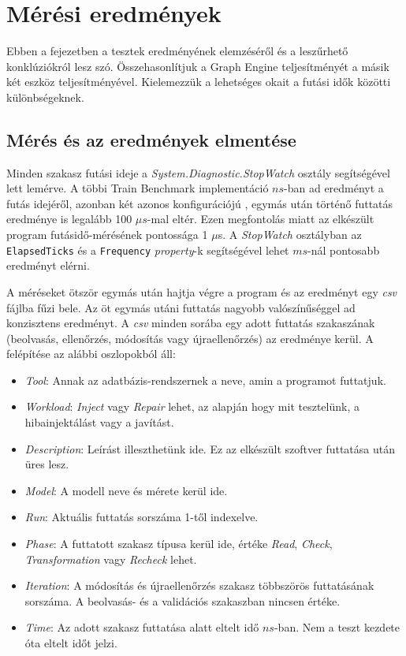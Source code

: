 \chapter{Mérési eredmények}

Ebben a fejezetben a tesztek eredményének elemzéséről és a leszűrhető konklúziókról lesz szó. Összehasonlítjuk a Graph Engine teljesítményét a másik két eszköz teljesítményével. Kielemezzük a lehetséges okait a futási idők közötti különbségeknek.

\section{Mérés és az eredmények elmentése}

Minden szakasz futási ideje a \emph{System.Diagnostic.StopWatch} osztály segítségével lett lemérve. A többi Train Benchmark implementáció $ns$-ban ad eredményt a futás idejéről, azonban két azonos konfigurációjú , egymás után történő futtatás eredménye is legalább 100 $\mu{}s$-mal eltér. Ezen megfontolás miatt az elkészült program futásidő-mérésének pontossága 1 $\mu{}$s. A \emph{StopWatch} osztályban az \texttt{ElapsedTicks} és a \texttt{Frequency} \emph{property}-k segítségével lehet $ms$-nál pontosabb eredményt elérni.

A méréseket ötször egymás után hajtja végre a program és az eredményt egy \emph{csv} fájlba fűzi bele. Az öt egymás utáni futtatás nagyobb valószínűséggel ad konzisztens eredményt. A \emph{csv} minden sorába egy adott futtatás szakaszának (beolvasás, ellenőrzés, módosítás vagy újraellenőrzés) az eredménye kerül. A felépítése az alábbi oszlopokból áll:

\begin{itemize}
	\item \emph{Tool}: Annak az adatbázis-rendszernek a neve, amin a programot futtatjuk.
	\item \emph{Workload}: \emph{Inject} vagy \emph{Repair} lehet, az alapján hogy mit tesztelünk, a hibainjektálást vagy a javítást.
	\item \emph{Description}: Leírást illeszthetünk ide. Ez az elkészült szoftver futtatása után üres lesz.
	\item \emph{Model}: A modell neve és mérete kerül ide.
	\item \emph{Run}: Aktuális futtatás sorszáma 1-től indexelve.
	\item \emph{Phase}: A futtatott szakasz típusa kerül ide, értéke \emph{Read}, \emph{Check}, \emph{Transformation} vagy \emph{Recheck} lehet.
	\item \emph{Iteration}: A módosítás és újraellenőrzés szakasz többszörös futtatásának sorszáma. A beolvasás- és a validációs szakaszban nincsen értéke.
	\item \emph{Time}: Az adott szakasz futtatása alatt eltelt idő $ns$-ban. Nem a teszt kezdete óta eltelt időt jelzi.
\end{itemize}

